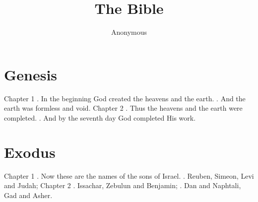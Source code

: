 \documentclass{article}%
\title{The Bible}%
\author{Anonymous}%
\begin{document}
%
\normalsize%
\maketitle%
\section*{Genesis}%
\label{sec:Genesis}%
Chapter 1%
. In the beginning God created the heavens and the earth.%
. And the earth was formless and void.%
\newline%
Chapter 2%
. Thus the heavens and the earth were completed.%
. And by the seventh day God completed His work.%
\newline

%
\section*{Exodus}%
\label{sec:Exodus}%
Chapter 1%
. Now these are the names of the sons of Israel.%
. Reuben, Simeon, Levi and Judah;%
\newline%
Chapter 2%
. Issachar, Zebulun and Benjamin;%
. Dan and Naphtali, Gad and Asher.%
\newline

%
\end{document}

